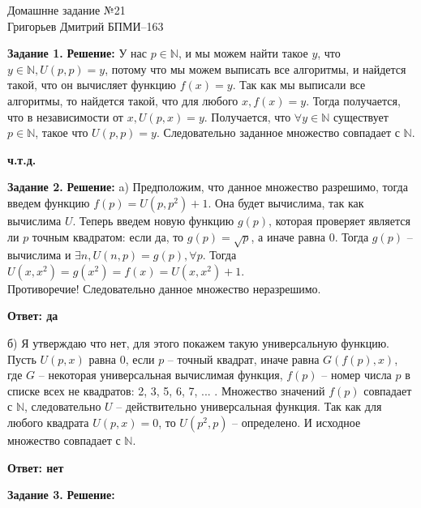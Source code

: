 \documentclass[12pt,a4paper]{scrartcl}
\begin{document}
	\begin{center}	
		Домашнне задание №21 \\
		Григорьев Дмитрий БПМИ--163
	\end{center}
	\textbf{Задание 1.}
	\newline
	\textbf{Решение:}
	\newline
	\indent
	У нас $p \in \mathbb{N}$, и мы можем найти такое $y$, что $y \in \mathbb{N}, U(p, p) = y$, потому что мы можем выписать все алгоритмы, и найдется такой, что он вычисляет функцию $f(x) = y$. Так как мы выписали все алгоритмы, то найдется такой, что для любого $x, f(x) = y$. Тогда получается, что в независимости от $x, U(p, x) = y$. Получается, что $\forall y \in \mathbb{N}$ существует $p \in \mathbb{N}$, такое что $U(p, p) = y$. Следовательно заданное множество совпадает с $\mathbb{N}$.
	\begin{flushright}	
		\textbf{ч.т.д.}
	\end{flushright}
	\textbf{Задание 2.} 
	\newline
	\textbf{Решение:}
	\newline
	\indent
	a) Предположим, что данное множество разрешимо, тогда введем функцию $f(p) = U(p, p^2) + 1$. Она будет вычислима, так как вычислима $U$.  Теперь введем новую функцию $g(p)$, которая проверяет является ли $p$ точным квадратом: если да, то $g(p) = \sqrt{p}$, а иначе равна 0. Тогда $g(p)$ -- вычислима и $\exists n, U(n, p) = g(p) , \forall{p}$. Тогда $U(x, x^2) = g(x^2) = f(x) = U(x, x^2) + 1$.\\
	Противоречие! Следовательно данное множество неразрешимо.
	\begin{flushright}	
		\textbf{Ответ: да}
	\end{flushright}
	\indent
	б) Я утверждаю что нет, для этого покажем такую универсальную функцию. Пусть $U(p, x)$ равна 0, если $p$ -- точный квадрат, иначе равна $G(f(p), x)$, где $G$ -- некоторая универсальная вычислимая функция, $f(p)$ -- номер числа $p$ в списке всех не квадратов: 2, 3, 5, 6, 7, ... . Множество значений $f(p)$ совпадает с $\mathbb{N}$, следовательно $U$ -- действительно универсальная функция. Так как для любого квадрата $U(p, x) = 0$, то $U(p^2, p)$ -- определено. И исходное множество совпадает с $\mathbb{N}$. \\
	\begin{flushright}	
		\textbf{Ответ: нет}
	\end{flushright}
	\textbf{Задание 3.} 
	\newline
	\textbf{Решение:} 
	\newline
\end{document}
